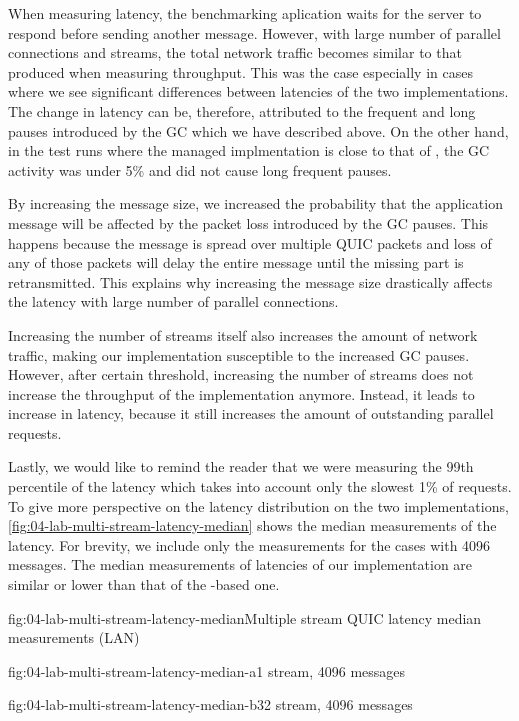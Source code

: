 When measuring latency, the benchmarking aplication waits for the server to respond before sending
another message. However, with large number of parallel connections and streams, the total network
traffic becomes similar to that produced when measuring throughput. This was the case especially in
cases where we see significant differences between latencies of the two implementations. The change
in latency can be, therefore, attributed to the frequent and long pauses introduced by the GC which
we have described above. On the other hand, in the test runs where the managed implmentation is
close to that of \libmsquic{}, the GC activity was under 5\% and did not cause long frequent pauses.

By increasing the message size, we increased the probability that the application message will be
affected by the packet loss introduced by the GC pauses. This happens because the message is spread
over multiple QUIC packets and loss of any of those packets will delay the entire message until the
missing part is retransmitted. This explains why increasing the message size drastically affects the
latency with large number of parallel connections.

Increasing the number of streams itself also increases the amount of network traffic, making our
implementation susceptible to the increased GC pauses. However, after certain threshold, increasing
the number of streams does not increase the throughput of the implementation anymore. Instead, it
leads to increase in latency, because it still increases the amount of outstanding parallel
requests.

Lastly, we would like to remind the reader that we were measuring the 99th percentile of the latency
which takes into account only the slowest 1\% of requests. To give more perspective on the latency
distribution on the two implementations, \autoref{fig:04-lab-multi-stream-latency-median} shows the
median measurements of the latency. For brevity, we include only the measurements for the cases with
\SI{4096}{\byte} messages. The median measurements of latencies of our implementation are similar or
lower than that of the \libmsquic{}-based one.

\begin{myFigure}{fig:04-lab-multi-stream-latency-median}{Multiple stream QUIC latency median measurements (LAN)}
\begin{mySubfigure}{0.49\linewidth}{fig:04-lab-multi-stream-latency-median-a}{1 stream, \SI{4096}{\byte} messages}
\footnotesize

\end{mySubfigure}
\begin{mySubfigure}{0.49\linewidth}{fig:04-lab-multi-stream-latency-median-b}{32 stream, \SI{4096}{\byte} messages}
\footnotesize

\end{mySubfigure}
\end{myFigure}

